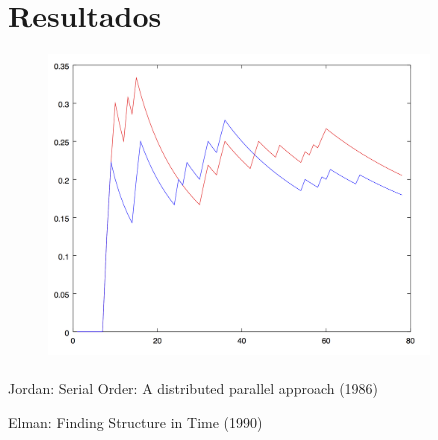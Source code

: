 \documentclass[10pt, a4paper,spanish]{article}
\begin{document}
	\section{Resultados}

		\begin{figure}[H]
			\begin{center}
				\includegraphics[width=0.9\textwidth]{chart}
			\end{center}
		\end{figure}

		\paragraph{}

  \begin{thebibliography}{9}

    	Jordan: Serial Order: A distributed parallel approach (1986)

    	Elman: Finding Structure in Time (1990)

	\end{thebibliography}
\end{document}
